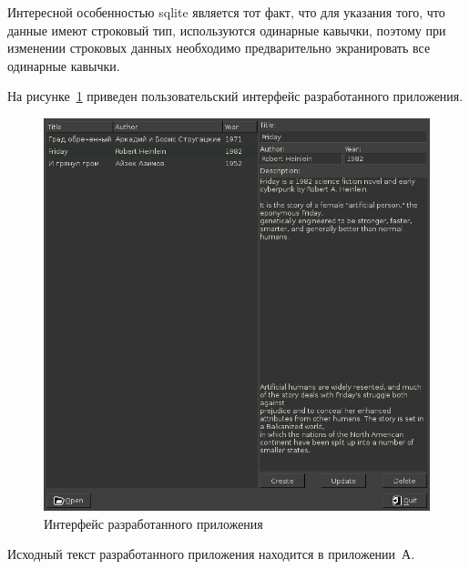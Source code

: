 Интересной особенностью sqlite является тот факт, 
что для указания того, что данные имеют строковый тип,
используются одинарные кавычки,
поэтому при изменении строковых данных необходимо
предварительно экранировать все одинарные кавычки.

На рисунке~\ref{pic:interface} приведен пользовательский интерфейс
разработанного приложения.

\begin{figure}[h!]
  \centering
  \includegraphics[width=150mm]{pic/interface}
  \caption{Интерфейс разработанного приложения}
  \label{pic:interface}
\end{figure}

Исходный текст разработанного приложения находится в приложении~А.